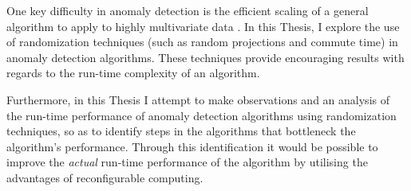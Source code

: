 One key difficulty in anomaly detection is the efficient scaling of a general
algorithm to apply to highly multivariate data \citeNeeded{}. In this Thesis, I
explore the use of randomization techniques (such as random projections and
commute time) in anomaly detection algorithms. These techniques provide
encouraging results with regards to the run-time complexity of an algorithm.

Furthermore, in this Thesis I attempt to make observations and an analysis of
the run-time performance of anomaly detection algorithms using randomization
techniques, so as to identify steps in the algorithms that bottleneck the
algorithm's performance. Through this identification it would be possible to
improve the \emph{actual} run-time performance of the algorithm by utilising the
advantages of reconfigurable computing.